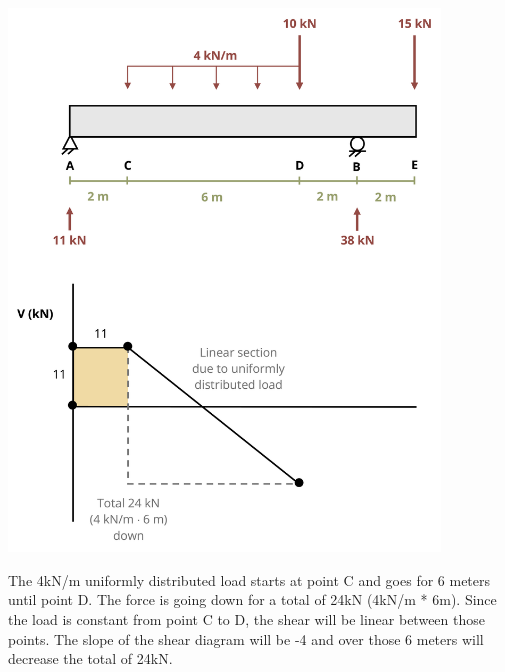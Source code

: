 \documentclass[
  letterpaper,
  DIV=11,
  numbers=noendperiod]{scrreprt}
\begin{document}
\begin{tcolorbox}
\begin{center}
\includegraphics[width=4.51042in,height=\textheight]{images/CH7 PNGs/example 7.3 part 4.png}
\end{center}

The 4kN/m uniformly distributed load starts at point C and goes for 6
meters until point D. The force is going down for a total of 24kN (4kN/m
* 6m). Since the load is constant from point C to D, the shear will be
linear between those points. The slope of the shear diagram will be -4
and over those 6 meters will decrease the total of 24kN.


\end{tcolorbox}
\end{document}
